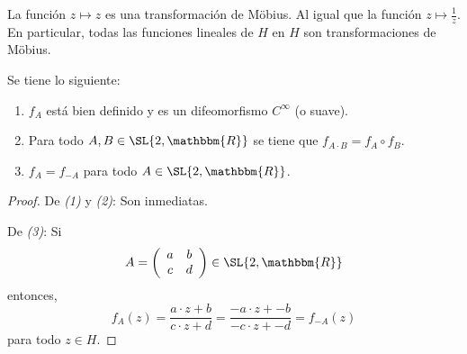 \documentclass[12pt]{report}
\theoremstyle{largebreak}
\newcommand{\bbm}[1]{\ensuremath{\mathbbm{#1}}}
\begin{document}
    \begin{exa}
        La función $z\mapsto z$ es una transformación de Möbius. Al igual que la función $z\mapsto\frac{1}{z}$. En particular, todas las funciones lineales de $H$ en $H$ son transformaciones de Möbius.
    \end{exa}

    \begin{propo}
        Se tiene lo siguiente:
        \begin{enumerate}[label = \textit{(\arabic*)}]
            \item $f_A$ está bien definido y es un difeomorfismo $C^\infty$ (o suave).
            \item Para todo $A,B\in\SL{2,\bbm{R}}$ se tiene que $f_{A\cdot B}=f_A\circ f_B$.
            \item $f_A=f_{-A}$ para todo $A\in\SL{2,\bbm{R}}$.
        \end{enumerate}
    \end{propo}

    \begin{proof}
        De \textit{(1)} y \textit{(2)}: Son inmediatas.

        De \textit{(3)}: Si
        \begin{equation*}
            A=\left(
                \begin{array}{cc}
                    a & b \\
                    c & d \\
                \end{array}
             \right)\in\SL{2,\bbm{R}}
        \end{equation*}
        entonces,
        \begin{equation*}
            f_A(z)=\frac{a\cdot z+b}{c\cdot z+d}=\frac{-a\cdot z+-b}{-c\cdot z+-d}=f_{-A}(z)
        \end{equation*}
        para todo $z\in H$.
    \end{proof}
\end{document}
